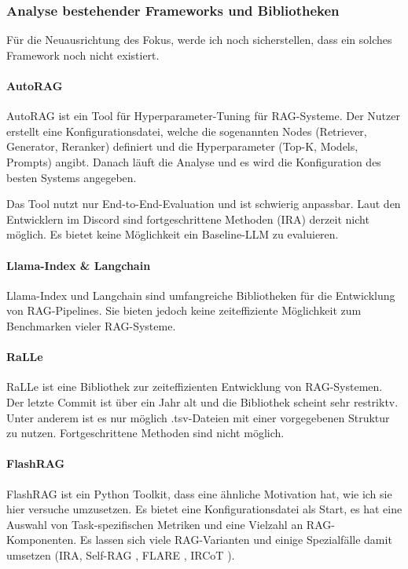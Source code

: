\documentclass[letterpaper, 10 pt, conference]{ieeeconf}
\begin{document}
\subsubsection{Analyse bestehender Frameworks und Bibliotheken}

Für die Neuausrichtung des Fokus, werde ich noch sicherstellen, dass ein solches Framework noch nicht existiert.

\paragraph{AutoRAG \cite{AutoRAG}}
AutoRAG ist ein Tool für Hyperparameter-Tuning für RAG-Systeme. Der Nutzer erstellt eine Konfigurationsdatei, welche 
die sogenannten Nodes (Retriever, Generator, Reranker) definiert und die Hyperparameter (Top-K, Models, Prompts) angibt. 
Danach läuft die Analyse und es wird die Konfiguration des besten Systems angegeben. 

Das Tool nutzt nur End-to-End-Evaluation und ist schwierig anpassbar. Laut den Entwicklern im Discord sind fortgeschrittene Methoden (IRA) derzeit nicht möglich. 
Es bietet keine Möglichkeit ein Baseline-LLM zu evaluieren. 

\paragraph{Llama-Index \cite{Liu_LlamaIndex_2022} \& Langchain \cite{Chase_LangChain_2022}}
Llama-Index und Langchain sind umfangreiche Bibliotheken für die Entwicklung von RAG-Pipelines. 
Sie bieten jedoch keine zeiteffiziente Möglichkeit zum Benchmarken vieler RAG-Systeme.

\paragraph{RaLLe \cite{ralle}}
RaLLe ist eine Bibliothek zur zeiteffizienten Entwicklung von RAG-Systemen. Der letzte Commit ist über ein Jahr alt und die Bibliothek scheint sehr restriktv. Unter anderem ist es nur möglich .tsv-Dateien mit einer vorgegebenen Struktur zu nutzen. Fortgeschrittene Methoden sind nicht möglich.

\paragraph{FlashRAG \cite{FlashRAG}}

FlashRAG ist ein Python Toolkit, dass eine ähnliche Motivation hat, wie ich sie hier versuche umzusetzen. 
Es bietet eine Konfigurationsdatei als Start, es hat eine Auswahl von Task-spezifischen Metriken und eine Vielzahl an RAG-Komponenten. Es lassen sich viele RAG-Varianten und einige Spezialfälle damit umsetzen (IRA, Self-RAG \cite{Asai.10172023}, FLARE \cite{Jiang.5112023}, IRCoT \cite{Trivedi.12202022}).
\end{document}
